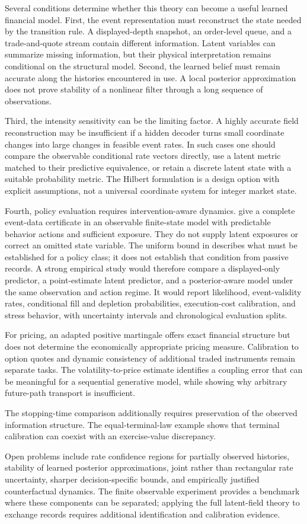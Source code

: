 Several conditions determine whether this theory can become a useful learned financial model. First, the event representation must reconstruct the state needed by the transition rule. A displayed-depth snapshot, an order-level queue, and a trade-and-quote stream contain different information. Latent variables can summarize missing information, but their physical interpretation remains conditional on the structural model. Second, the learned belief must remain accurate along the histories encountered in use. A local posterior approximation does not prove stability of a nonlinear filter through a long sequence of observations.

Third, the intensity sensitivity can be the limiting factor. A highly accurate field reconstruction may be insufficient if a hidden decoder turns small coordinate changes into large changes in feasible event rates. In such cases one should compare the observable conditional rate vectors directly, use a latent metric matched to their predictive equivalence, or retain a discrete latent state with a suitable probability metric. The Hilbert formulation is a design option with explicit assumptions, not a universal coordinate system for integer market state.

Fourth, policy evaluation requires intervention-aware dynamics.  give a complete event-data certificate in an observable finite-state model with predictable behavior actions and sufficient exposure. They do not supply latent exposures or correct an omitted state variable. The uniform bound in  describes what must be established for a policy class; it does not establish that condition from passive records. A strong empirical study would therefore compare a displayed-only predictor, a point-estimate latent predictor, and a posterior-aware model under the same observation and action regime. It would report likelihood, event-validity rates, conditional fill and depletion probabilities, execution-cost calibration, and stress behavior, with uncertainty intervals and chronological evaluation splits.

For pricing, an adapted positive martingale offers exact financial structure but does not determine the economically appropriate pricing measure. Calibration to option quotes and dynamic consistency of additional traded instruments remain separate tasks. The volatility-to-price estimate identifies a coupling error that can be meaningful for a sequential generative model, while showing why arbitrary future-path transport is insufficient.

The stopping-time comparison additionally requires preservation of the observed information structure. The equal-terminal-law example shows that terminal calibration can coexist with an exercise-value discrepancy.

Open problems include rate confidence regions for partially observed histories, stability of learned posterior approximations, joint rather than rectangular rate uncertainty, sharper decision-specific bounds, and empirically justified counterfactual dynamics. The finite observable experiment provides a benchmark where these components can be separated; applying the full latent-field theory to exchange records requires additional identification and calibration evidence.

